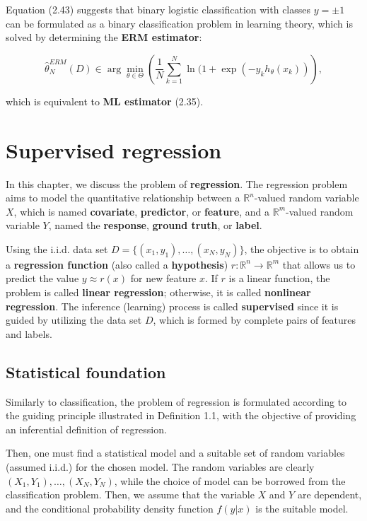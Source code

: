 \documentclass{report}
\begin{document}
Equation (2.43) suggests that binary logistic classification with classes $y=\pm 1$ can be formulated as a binary classification problem in learning theory, which is solved by determining the \textbf{ERM estimator}:

\begin{equation}
\hat{\theta}_N^{ERM}(D) \in \arg \min_{\theta \in \Theta}\left(\frac{1}{N}\sum_{k=1}^N \ln(1+\exp(-y_kh_\theta(x_k))\right),
\end{equation}

which is equivalent to \textbf{ML estimator} (2.35).

\chapter{Supervised regression}
In this chapter, we discuss the problem of \textbf{regression}. The regression problem aims to model the quantitative relationship between a $\mathbb{R}^n$-valued random variable $X$, which is named \textbf{covariate}, \textbf{predictor}, or \textbf{feature}, and a $\mathbb{R}^m$-valued random variable $Y$, named the \textbf{response}, \textbf{ground truth}, or \textbf{label}.

Using the i.i.d. data set $D = \{(x_1,y_1),\dots,(x_N,y_N)\}$, the objective is to obtain a \textbf{regression function} (also called a \textbf{hypothesis}) $r : \mathbb{R}^n \to \mathbb{R}^m$ that allows us to predict the value $y \approx r(x)$ for new feature $x$. If $r$ is a linear function, the problem is called \textbf{linear regression}; otherwise, it is called \textbf{nonlinear regression}. The inference (learning) process is called \textbf{supervised} since it is guided by
utilizing the data set $D$, which is formed by complete pairs of features and labels.

\section{Statistical foundation}
Similarly to classification, the problem of regression is formulated according to the guiding principle illustrated in Definition 1.1, with the objective of providing an inferential definition of regression.

Then, one must find a statistical model and a suitable set of random variables (assumed i.i.d.) for the chosen model. The random variables are clearly $(X_1,Y_1),\dots,(X_N,Y_N)$, while the choice of model can be borrowed from the classification problem. Then, we assume that the variable $X$ and $Y$ are dependent, and the conditional probability density function $f(y|x)$ is the suitable model.
\end{document}
